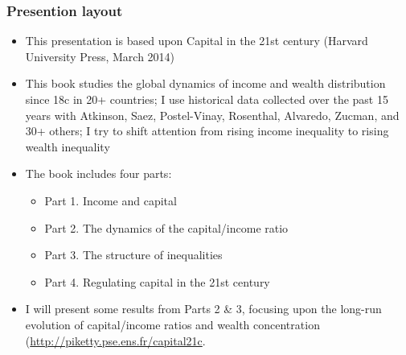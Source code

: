 
\begin{frame}[label=TitlePage_1]
\maketitle%
\end{frame}


\begin{frame}[label=Introduction_1]
\frametitle{Presention layout}
\begin{itemize}
\item
This presentation is based upon Capital in the 21st century (Harvard University Press, March 2014)
\item
This book studies the global dynamics of income and wealth distribution since 18c in 20+ countries; I use historical data collected over the past 15 years with Atkinson, Saez, Postel-Vinay, Rosenthal, Alvaredo, Zucman, and 30+ others; I try to shift attention from rising income inequality to rising wealth inequality
\item
The book includes four parts:
\begin{itemize}
\item
Part 1. Income and capital
\item
Part 2. The dynamics of the capital/income ratio 
\item
Part 3. The structure of inequalities
\item
Part 4. Regulating capital in the 21st century
\end{itemize}
\item 
I will present some results from Parts 2 \& 3, focusing upon the long-run evolution of capital/income ratios and wealth concentration (\href{all graphs and series are available online}{http://piketty.pse.ens.fr/capital21c}.
\end{itemize}
\end{frame}


